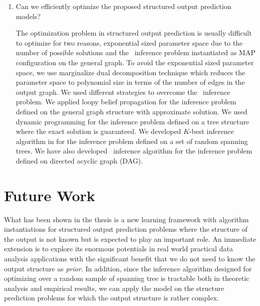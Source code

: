 {\begin{enumerate}[label=\textbf{Q \Roman*}:]
\item Can we efficiently optimize the proposed structured output prediction models?

The optimization problem in structured output prediction is usually difficult to optimize for two reasons, exponential sized parameter space due to the number of possible solutions and the \nphard\ inference problem instantiated as MAP configuration on the general graph.
To avoid the exponential sized parameter space, we use marginalize dual decomposition technique which reduces the parameter space to polynomial size in terms of the number of edges in the output graph.
We used different strategies to overcome the \nphard\ inference problem.
We applied loopy belief propagation for the inference problem defined on the general graph structure with approximate solution.
We used dynamic programming for the inference problem defined on a tree structure where the exact solution is guaranteed.
We developed $K$-best inference algorithm in  for the inference problem defined on a set of random spanning trees.
We have also developed \sdp\ inference algorithm for the inference problem defined on directed acyclic graph (DAG).
\end{enumerate}

\section{Future Work}

What has been shown in the thesis is a new learning framework with algorithm instantiations for structured output prediction problems where the structure of the output is not known but is expected to play an important role.
An immediate extension is to explore its enormous potentials in real world practical data analysis applications with the significant benefit that we do not need to know the output structure as \textit{prior}.
In addition, since the inference algorithm designed for optimizing over a random sample of spanning tree is tractable both in theoretic analysis and empirical results, we can apply the model on the structure prediction problems for which the output structure is rather complex.

}
